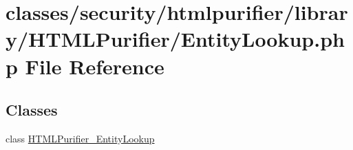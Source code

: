 \hypertarget{EntityLookup_8php}{\section{classes/security/htmlpurifier/library/\+H\+T\+M\+L\+Purifier/\+Entity\+Lookup.php File Reference}
\label{EntityLookup_8php}
}
\subsection*{Classes}
\begin{DoxyCompactItemize}
\item 
class \hyperlink{classHTMLPurifier__EntityLookup}{H\+T\+M\+L\+Purifier\+\_\+\+Entity\+Lookup}
\end{DoxyCompactItemize}
